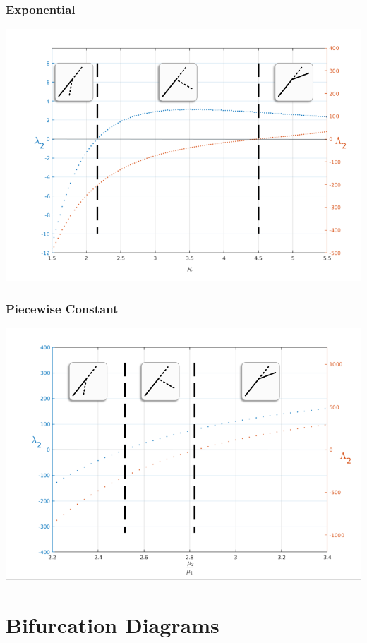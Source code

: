 \documentclass{beamer}
\begin{document}
\begin{frame}
	\frametitle{Exponential}
	
	\includegraphics[width = \textwidth]{myFigures/lambdas_exp}
\end{frame}

\begin{frame}
	\frametitle{Piecewise Constant}
	\includegraphics[width = \textwidth]{myFigures/lambdas_pieceConst}
\end{frame}

\section{Bifurcation Diagrams}
\end{document}
